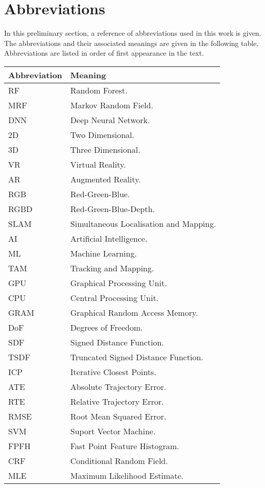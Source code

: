 \section*{Abbreviations}
In this preliminary section, a reference of abbreviations used in this work is given. The 
abbreviations and their associated meanings are given in the following table. 
Abbreviations are listed in order of first appearance in the text.
\begin{longtable}{p{} | p{}}
  \midrule
  Abbreviation & Meaning \\
  \midrule
  RF & Random Forest.\\
  MRF & Markov Random Field.\\
  DNN & Deep Neural Network.\\
  \midrule
  2D & Two Dimensional.\\
  3D & Three Dimensional.\\
  VR & Virtual Reality.\\
  AR & Augmented Reality.\\
  RGB & Red-Green-Blue.\\
  RGBD & Red-Green-Blue-Depth.\\
  SLAM & Simultaneous Localisation and Mapping.\\
  AI & Artificial Intelligence.\\
  ML & Machine Learning.\\
  TAM & Tracking and Mapping.\\
  GPU & Graphical Processing Unit.\\
  CPU & Central Processing Unit.\\
  GRAM & Graphical Random Access Memory.\\
  DoF & Degrees of Freedom.\\
  SDF & Signed Distance Function.\\
  \midrule
  TSDF & Truncated Signed Distance Function.\\
  ICP & Iterative Closest Points.\\
  ATE & Absolute Trajectory Error.\\
  RTE & Relative Trajectory Error.\\
  RMSE & Root Mean Squared Error.\\
  SVM & Suport Vector Machine.\\
  FPFH & Fast Point Feature Histogram.\\
  \midrule
  CRF & Conditional Random Field.\\
  MLE & Maximum Likelihood Estimate.\\

\end{longtable}
